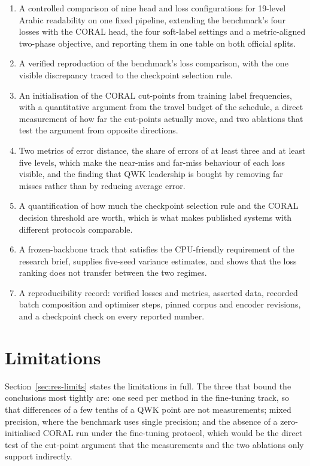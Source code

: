 \begin{enumerate}
\item A controlled comparison of nine head and loss configurations for 19-level Arabic
readability on one fixed pipeline, extending the benchmark's four losses with the CORAL head,
the four soft-label settings and a metric-aligned two-phase objective, and reporting them in one
table on both official splits.
\item A verified reproduction of the benchmark's loss comparison, with the one visible
discrepancy traced to the checkpoint selection rule.
\item An initialisation of the CORAL cut-points from training label frequencies, with a
quantitative argument from the travel budget of the schedule, a direct measurement of how far
the cut-points actually move, and two ablations that test the argument from opposite directions.
\item Two metrics of error distance, the share of errors of at least three and at least five
levels, which make the near-miss and far-miss behaviour of each loss visible, and the finding
that QWK leadership is bought by removing far misses rather than by reducing average error.
\item A quantification of how much the checkpoint selection rule and the CORAL decision
threshold are worth, which is what makes published systems with different protocols comparable.
\item A frozen-backbone track that satisfies the CPU-friendly requirement of the research
brief, supplies five-seed variance estimates, and shows that the loss ranking does not transfer
between the two regimes.
\item A reproducibility record: verified losses and metrics, asserted data, recorded batch
composition and optimiser steps, pinned corpus and encoder revisions, and a checkpoint check on
every reported number.
\end{enumerate}

\section{Limitations}

Section~\ref{sec:res-limits} states the limitations in full. The three that bound the
conclusions most tightly are: one seed per method in the fine-tuning track, so that differences
of a few tenths of a QWK point are not measurements; mixed precision, where the benchmark uses
single precision; and the absence of a zero-initialised CORAL run under the fine-tuning
protocol, which would be the direct test of the cut-point argument that the measurements and
the two ablations only support indirectly.

